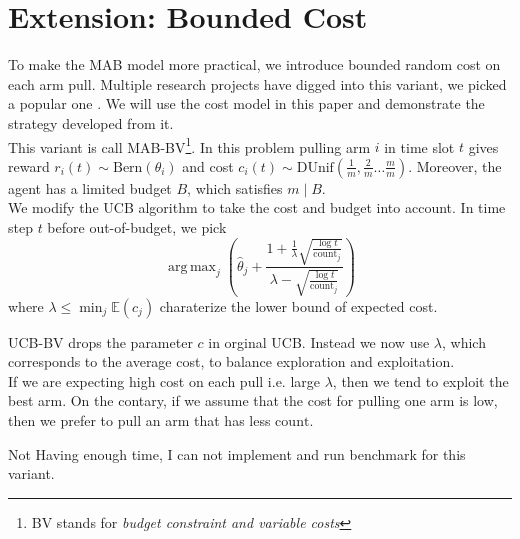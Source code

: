 \documentclass{article}
\DeclareMathOperator*{\argmax}{arg\,max}
\newenvironment{newSec}[1]{
	\section{#1}
	\lhead{#1}
	\chead{}
	\rhead{}
}{ \newpage }
\begin{document}
\begin{newSec}{Extension: Bounded Cost}
	To make the MAB model more practical, we introduce bounded random cost on each arm pull.
	Multiple research projects have digged into this variant, we picked a popular one \cite{paper:cost}.
	We will use the cost model in this paper and demonstrate the strategy developed from it.\\

	This variant is call MAB-BV\footnote{BV stands for \textit{budget constraint and variable costs}}.
	In this problem pulling arm $i$ in time slot $t$ gives reward $r_i(t)\sim \mathrm{Bern}(\theta_i)$ and cost $c_i(t)\sim \mathrm{DUnif}(\frac{1}{m},\frac{2}{m}\ldots \frac{m}{m})$.
	Moreover, the agent has a limited budget $B$, which satisfies $m \mid B$.\\

	We modify the UCB algorithm to take the cost and budget into account.
	In time step $t$ before out-of-budget, we pick
	\[
		\argmax_j
		\left(
		\hat\theta_j + \frac{1+\frac{1}{\lambda} \sqrt{\frac{\log t}{\mathrm{count}_j}}}{\lambda-\sqrt{\frac{\log t}{\mathrm{count}_j}}}
		\right)
	\]
	where $\lambda \leq \min_j \mathbb{E}(c_j)$ charaterize the lower bound of expected cost.\par

	UCB-BV drops the parameter $c$ in orginal UCB. Instead we now use $\lambda$, which corresponds to the average cost, to balance exploration and exploitation.\\
	If we are expecting high cost on each pull i.e. large $\lambda$,
	then we tend to exploit the best arm.
	On the contary, if we assume that the cost for pulling one arm is low, then we prefer to pull an arm that has less $\mathrm{count}$.

	\vspace{4ex}

	Not Having enough time, I can not implement and run benchmark for this variant.
\end{newSec}

\newpage
\appendix
\printbibliography[
	heading=bibintoc,
	title={reference}
]
\end{document}
